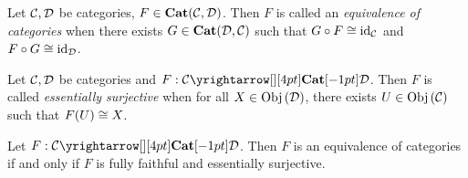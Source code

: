 \begin{dfn}
  
  Let $\mathcal{C}, \mathcal{D}$ be categories, $F \in \mathbf{Cat}(\mathcal{C},\mathcal{D})$.
  Then $F$ is called an \emph{equivalence of categories} when 
  there exists $G \in \mathbf{Cat}(\mathcal{D},\mathcal{C})$ such that  
  $G \circ F \cong \mathrm{id}_{\mathcal{C}}$ and $F\circ G \cong \mathrm{id}_{\mathcal{D}}$. 
\end{dfn}

\begin{dfn}
  
  Let $\mathcal{C},\mathcal{D}$ be categories and $F : \map{\CC}{\DD}{\CAT}{}$. 
  Then $F$ is called \emph{essentially surjective} when 
  for all $X \in \mathrm{Obj}\left(\mathcal{D}\right)$, there exists $U \in \mathrm{Obj}\left(\mathcal{C}\right)$ such that 
  $F(U) \cong X$. 
\end{dfn}

\begin{prop}
  
  Let $F : \map{\CC}{\DD}{\CAT}{}$. 
  Then $F$ is an equivalence of categories if and only if 
  $F$ is fully faithful and essentially surjective. 
\end{prop}